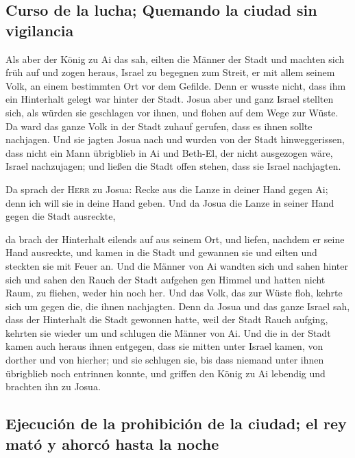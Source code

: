 \hypertarget{curso-de-la-lucha-quemando-la-ciudad-sin-vigilancia}{%
\subsection{Curso de la lucha; Quemando la ciudad sin
vigilancia}\label{curso-de-la-lucha-quemando-la-ciudad-sin-vigilancia}}

 Als aber der König zu Ai das sah, eilten die Männer der
Stadt und machten sich früh auf und zogen heraus, Israel zu begegnen zum
Streit, er mit allem seinem Volk, an einem bestimmten Ort vor dem
Gefilde. Denn er wusste nicht, dass ihm ein Hinterhalt gelegt war hinter
der Stadt.  Josua aber und ganz Israel stellten sich, als
würden sie geschlagen vor ihnen, und flohen auf dem Wege zur Wüste.
 Da ward das ganze Volk in der Stadt zuhauf gerufen, dass
es ihnen sollte nachjagen.  Und sie jagten Josua nach und
wurden von der Stadt hinweggerissen, dass nicht ein Mann übrigblieb in
Ai und Beth-El, der nicht ausgezogen wäre, Israel nachzujagen; und
ließen die Stadt offen stehen, dass sie Israel nachjagten.

 Da sprach der \textsc{Herr} zu Josua: Recke aus die
Lanze in deiner Hand gegen Ai; denn ich will sie in deine Hand geben.
Und da Josua die Lanze in seiner Hand gegen die Stadt ausreckte,

 da brach der Hinterhalt eilends auf aus seinem Ort, und
liefen, nachdem er seine Hand ausreckte, und kamen in die Stadt und
gewannen sie und eilten und steckten sie mit Feuer an. 
Und die Männer von Ai wandten sich und sahen hinter sich und sahen den
Rauch der Stadt aufgehen gen Himmel und hatten nicht Raum, zu fliehen,
weder hin noch her. Und das Volk, das zur Wüste floh, kehrte sich um
gegen die, die ihnen nachjagten.  Denn da Josua und das
ganze Israel sah, dass der Hinterhalt die Stadt gewonnen hatte, weil der
Stadt Rauch aufging, kehrten sie wieder um und schlugen die Männer von
Ai.  Und die in der Stadt kamen auch heraus ihnen
entgegen, dass sie mitten unter Israel kamen, von dorther und von
hierher; und sie schlugen sie, bis dass niemand unter ihnen übrigblieb
noch entrinnen konnte,  und griffen den König zu Ai
lebendig und brachten ihn zu Josua.

\hypertarget{ejecuciuxf3n-de-la-prohibiciuxf3n-de-la-ciudad-el-rey-matuxf3-y-ahorcuxf3-hasta-la-noche}{%
\subsection{Ejecución de la prohibición de la ciudad; el rey mató y
ahorcó hasta la
noche}\label{ejecuciuxf3n-de-la-prohibiciuxf3n-de-la-ciudad-el-rey-matuxf3-y-ahorcuxf3-hasta-la-noche}}

